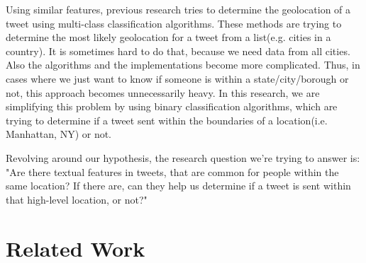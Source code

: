 \documentclass[twoside,11pt]{article}
\begin{document}
Using similar features, previous research tries to determine the geolocation of a tweet using multi-class classification algorithms. These methods are trying to determine the most likely geolocation for a tweet from a list(e.g. cities in a country). It is sometimes hard to do that, because we need data from all cities. Also the algorithms and the implementations become more complicated. Thus, in cases where we just want to know if someone is within a state/city/borough or not, this approach becomes unnecessarily heavy. In this research, we are simplifying this problem by using binary classification algorithms, which are trying to determine if a tweet sent within the boundaries of a location(i.e. Manhattan, NY) or not. 

Revolving around our hypothesis, the research question we're trying to answer is: "Are there textual features in tweets, that are common for people within the same location? If there are, can they help us determine if a tweet is sent within that high-level location, or not?"


\section{Related Work}





\end{document}

